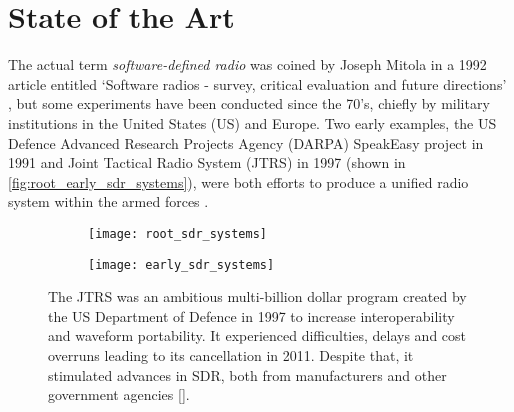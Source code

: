 \section{State of the Art}

The actual term \emph{software-defined radio} was coined by Joseph Mitola in a 1992 article entitled `Software radios - survey, critical evaluation and future directions' \cite{ntc92}, but some experiments have been conducted since the 70's, chiefly by military institutions in the United States (US) and Europe. Two early examples, the US Defence Advanced Research Projects Agency (DARPA) SpeakEasy project in 1991 and Joint Tactical Radio System (JTRS) in 1997 (shown in \autoref{fig:root_early_sdr_systems}), were both efforts to produce a unified radio system within the armed forces \cite{sdr_short_history}.

\begin{figure} [ht]
  \begin{subfigure}{.5\textwidth}
    \centering
    \texttt{[image: root\_sdr\_systems]}
    \label{fig:root_sdr_systems}
  \end{subfigure}%
  \begin{subfigure}{.5\textwidth}
    \centering
    \texttt{[image: early\_sdr\_systems]}
    \label{fig:early_sdr_systems}
  \end{subfigure}
  \caption[The JTRS multi-billion dollar program created by the US]{The JTRS was an ambitious multi-billion dollar program created by the US Department of Defence in 1997 to increase interoperability and waveform portability. It experienced difficulties, delays and  cost overruns leading to its cancellation in 2011. Despite that, it stimulated advances in SDR, both from manufacturers and other government agencies [\citeauthor{image:root_sdr_systems}].}
  \label{fig:root_early_sdr_systems}
\end{figure}

